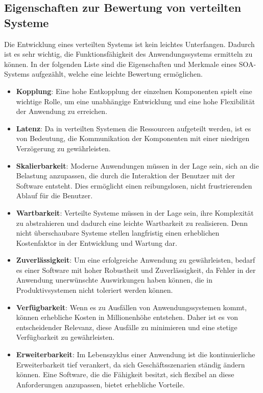 \subsection{Eigenschaften zur Bewertung von verteilten Systeme}
\label{eigenschaftenVonVerteiltenSystemen}
Die Entwicklung eines verteilten Systems ist kein leichtes Unterfangen. Dadurch ist es sehr wichtig, die Funktionsfähigkeit des Anwendungssystems ermitteln zu können. In der folgenden Liste sind die Eigenschaften und Merkmale eines SOA-Systems aufgezählt, welche eine leichte Bewertung ermöglichen. \cite{toshevLearningRabbitMQBuild2016,curryMessageOrientedMiddleware2004}

\begin{itemize}
	\item \textbf{Kopplung}: Eine hohe Entkopplung der einzelnen Komponenten spielt eine wichtige Rolle, um eine unabhängige Entwicklung und eine hohe Flexibilität der Anwendung zu erreichen.
	\item \textbf{Latenz}: Da in verteilten Systemen die Ressourcen aufgeteilt werden, ist es von Bedeutung, die Kommunikation der Komponenten mit einer niedrigen Verzögerung zu gewährleisten.
	\item \textbf{Skalierbarkeit}: Moderne Anwendungen müssen in der Lage sein, sich an die Belastung anzupassen, die durch die Interaktion der Benutzer mit der Software entsteht. Dies ermöglicht einen reibungslosen, nicht frustrierenden Ablauf für die Benutzer.
	\item \textbf{Wartbarkeit}: Verteilte Systeme müssen in der Lage sein, ihre Komplexität zu abstrahieren und dadurch eine leichte Wartbarkeit zu realisieren. Denn nicht überschaubare Systeme stellen langfristig einen erheblichen Kostenfaktor in der Entwicklung und Wartung dar.
	\item \textbf{Zuverlässigkeit}: Um eine erfolgreiche Anwendung zu gewährleisten, bedarf es einer Software mit hoher Robustheit und Zuverlässigkeit, da Fehler in der Anwendung unerwünschte Auswirkungen haben können, die in Produktivsystemen nicht toleriert werden können.
	\item \textbf{Verfügbarkeit}: Wenn es zu Ausfällen von Anwendungssystemen kommt, können erhebliche Kosten in Millionenhöhe entstehen. Daher ist es von entscheidender Relevanz, diese Ausfälle zu minimieren und eine stetige Verfügbarkeit zu gewährleisten.
	\item \textbf{Erweiterbarkeit}: Im Lebenszyklus einer Anwendung ist die kontinuierliche Erweiterbarkeit tief verankert, da sich Geschäftsszenarien ständig ändern können. Eine Software, die die Fähigkeit besitzt, sich flexibel an diese Anforderungen anzupassen, bietet erhebliche Vorteile.
\end{itemize}

